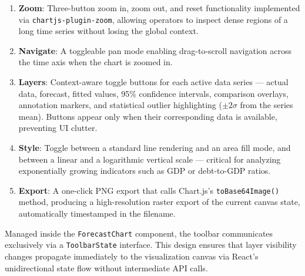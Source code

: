 \begin{enumerate}
    \item \textbf{Zoom}: Three-button zoom in, zoom out, and reset functionality implemented via \texttt{chartjs-plugin-zoom}, allowing operators to inspect dense regions of a long time series without losing the global context.
    \item \textbf{Navigate}: A toggleable pan mode enabling drag-to-scroll navigation across the time axis when the chart is zoomed in.
    \item \textbf{Layers}: Context-aware toggle buttons for each active data series — actual data, forecast, fitted values, 95\% confidence intervals, comparison overlays, annotation markers, and statistical outlier highlighting ($\pm 2\sigma$ from the series mean). Buttons appear only when their corresponding data is available, preventing UI clutter.
    \item \textbf{Style}: Toggle between a standard line rendering and an area fill mode, and between a linear and a logarithmic vertical scale — critical for analyzing exponentially growing indicators such as GDP or debt-to-GDP ratios.
    \item \textbf{Export}: A one-click PNG export that calls Chart.js's \texttt{toBase64Image()} method, producing a high-resolution raster export of the current canvas state, automatically timestamped in the filename.
\end{enumerate}

Managed inside the \texttt{Forecast\-Chart} component, the toolbar communicates exclusively via a \texttt{Toolbar\-State} interface. This design ensures that layer visibility changes propagate immediately to the visualization canvas via React's unidirectional state flow without intermediate API calls.
